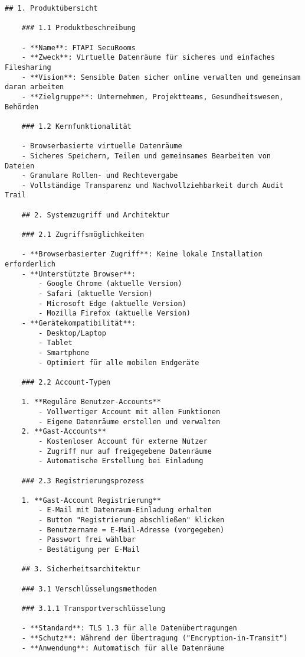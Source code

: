 \begin{Verbatim}[breaklines=true]
    ## 1. Produktübersicht

    ### 1.1 Produktbeschreibung
    
    - **Name**: FTAPI SecuRooms
    - **Zweck**: Virtuelle Datenräume für sicheres und einfaches Filesharing
    - **Vision**: Sensible Daten sicher online verwalten und gemeinsam daran arbeiten
    - **Zielgruppe**: Unternehmen, Projektteams, Gesundheitswesen, Behörden
    
    ### 1.2 Kernfunktionalität
    
    - Browserbasierte virtuelle Datenräume
    - Sicheres Speichern, Teilen und gemeinsames Bearbeiten von Dateien
    - Granulare Rollen- und Rechtevergabe
    - Vollständige Transparenz und Nachvollziehbarkeit durch Audit Trail
    
    ## 2. Systemzugriff und Architektur
    
    ### 2.1 Zugriffsmöglichkeiten
    
    - **Browserbasierter Zugriff**: Keine lokale Installation erforderlich
    - **Unterstützte Browser**:
        - Google Chrome (aktuelle Version)
        - Safari (aktuelle Version)
        - Microsoft Edge (aktuelle Version)
        - Mozilla Firefox (aktuelle Version)
    - **Gerätekompatibilität**:
        - Desktop/Laptop
        - Tablet
        - Smartphone
        - Optimiert für alle mobilen Endgeräte
    
    ### 2.2 Account-Typen
    
    1. **Reguläre Benutzer-Accounts**
        - Vollwertiger Account mit allen Funktionen
        - Eigene Datenräume erstellen und verwalten
    2. **Gast-Accounts**
        - Kostenloser Account für externe Nutzer
        - Zugriff nur auf freigegebene Datenräume
        - Automatische Erstellung bei Einladung
    
    ### 2.3 Registrierungsprozess
    
    1. **Gast-Account Registrierung**
        - E-Mail mit Datenraum-Einladung erhalten
        - Button "Registrierung abschließen" klicken
        - Benutzername = E-Mail-Adresse (vorgegeben)
        - Passwort frei wählbar
        - Bestätigung per E-Mail
    
    ## 3. Sicherheitsarchitektur
    
    ### 3.1 Verschlüsselungsmethoden
    
    ### 3.1.1 Transportverschlüsselung
    
    - **Standard**: TLS 1.3 für alle Datenübertragungen
    - **Schutz**: Während der Übertragung ("Encryption-in-Transit")
    - **Anwendung**: Automatisch für alle Datenräume
    

\end{Verbatim}
